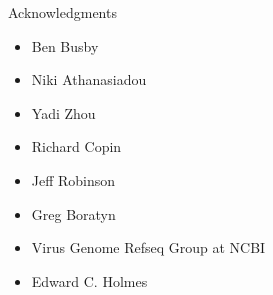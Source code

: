\documentclass{beamer}
\begin{document}
  \begin{frame}{Acknowledgments}
    \begin{itemize}
      \item Ben Busby
      \item Niki Athanasiadou
      \item Yadi Zhou
      \item Richard Copin
      \item Jeff Robinson
      \item Greg Boratyn
      \item Virus Genome Refseq Group at NCBI
      \item Edward C. Holmes
    \end{itemize}
  \end{frame}
\end{document}

